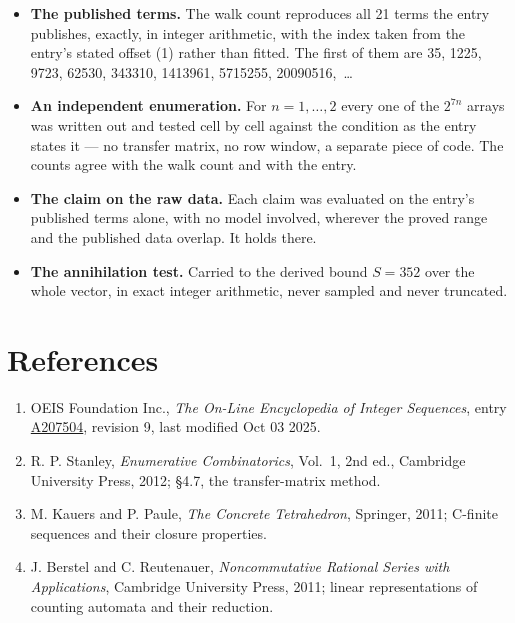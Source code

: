 \documentclass[11pt]{article}
\theoremstyle{definition}
\begin{document}
\begin{itemize}

\item {\bfseries The published terms.} The walk count reproduces all 21 terms the entry publishes, exactly, in integer arithmetic, with the index taken from the entry's stated offset (1) rather than fitted. The first of them are 35, 1225, 9723, 62530, 343310, 1413961, 5715255, 20090516,~\dots

\item {\bfseries An independent enumeration.} For $n = 1,\dots,2$ every one of the $2^{7n}$ arrays was written out and tested cell by cell against the condition as the entry states it --- no transfer matrix, no row window, a separate piece of code. The counts agree with the walk count and with the entry.

\item {\bfseries The claim on the raw data.} Each claim was evaluated on the entry's published terms alone, with no model involved, wherever the proved range and the published data overlap. It holds there.

\item {\bfseries The annihilation test.} Carried to the derived bound $S = 352$ over the whole vector, in exact integer arithmetic, never sampled and never truncated.

\end{itemize}

\section{References}

\begin{enumerate}

\item OEIS Foundation Inc., \emph{The On-Line Encyclopedia of Integer Sequences}, entry \href{https://oeis.org/A207504}{A207504}, revision 9, last modified Oct 03 2025.

\item R. P. Stanley, \emph{Enumerative Combinatorics}, Vol.~1, 2nd ed., Cambridge University Press, 2012; \S4.7, the transfer-matrix method.

\item M. Kauers and P. Paule, \emph{The Concrete Tetrahedron}, Springer, 2011; C-finite sequences and their closure properties.

\item J. Berstel and C. Reutenauer, \emph{Noncommutative Rational Series with Applications}, Cambridge University Press, 2011; linear representations of counting automata and their reduction.

\end{enumerate}
\end{document}
